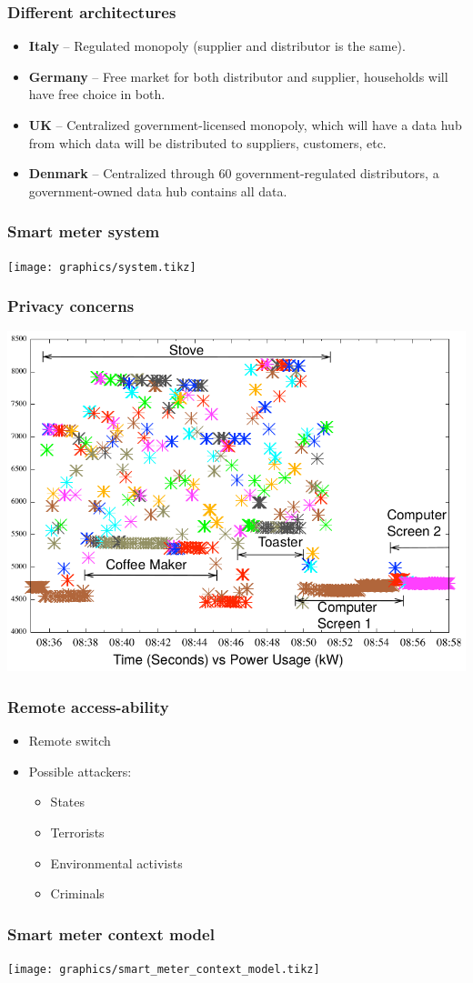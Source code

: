 \begin{frame}
  \frametitle{Different architectures}
  \begin{itemize}
	\item \textbf{Italy} -- Regulated monopoly (supplier and distributor is the same).
	\item \textbf{Germany} -- Free market for both distributor and supplier, households will have free choice in both.
	\item \textbf{UK} -- Centralized government-licensed monopoly, which will have a data hub from which data will be distributed to suppliers, customers, etc.
	\item \textbf{Denmark} -- Centralized through 60 government-regulated distributors, a government-owned data hub contains all data.
\end{itemize}

\end{frame}

\begin{frame}
  \frametitle{Smart meter system}
  \texttt{[image: graphics/system.tikz]}
\end{frame}

\begin{frame}
  \frametitle{Privacy concerns}
  \includegraphics{graphics/detailed.png}
\end{frame}

\begin{frame}
  \frametitle{Remote access-ability}
  \begin{itemize}
  \item Remote switch
  \item Possible attackers:
    \begin{itemize}
    \item States
    \item Terrorists
    \item Environmental activists
    \item Criminals
    \end{itemize}
  \end{itemize}
\end{frame}

\begin{frame}
  \frametitle{Smart meter context model}
  \texttt{[image: graphics/smart\_meter\_context\_model.tikz]}
\end{frame}

